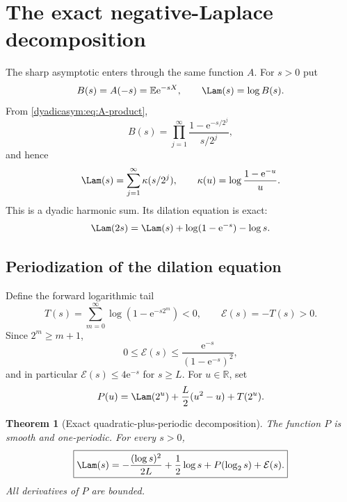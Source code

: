 \documentclass[11pt,oneside]{article}
\newtheorem{theorem}{Theorem}[section]
\theoremstyle{definition}
\theoremstyle{remark}
\newcommand{\R}{\mathbb R}
\newcommand{\e}{\mathrm e}
\newcommand{\E}{\mathbb E}
\begin{document}
\section{The exact negative-Laplace decomposition}
\label{dyadicasym:sec:laplace-product}

The sharp asymptotic enters through the same function $A$.  For $s>0$ put
\begin{equation}
 B(s)=A(-s)=\E\e^{-sX},
 \qquad
 \Lam(s)=\log B(s).                                         \label{dyadicasym:eq:B-Lambda}
\end{equation}
From \eqref{dyadicasym:eq:A-product},
\begin{equation}
 B(s)=\prod_{j=1}^{\infty}
 \frac{1-\e^{-s/2^j}}{s/2^j},                               \label{dyadicasym:eq:B-product}
\end{equation}
and hence
\begin{equation}
 \Lam(s)=\sum_{j=1}^{\infty}\kappa(s/2^j),
 \qquad
 \kappa(u)=\log\frac{1-\e^{-u}}u.                          \label{dyadicasym:eq:Lambda-harmonic}
\end{equation}
This is a dyadic harmonic sum.  Its dilation equation is exact:
\begin{equation}
 \Lam(2s)=\Lam(s)+\log(1-\e^{-s})-\log s.                  \label{dyadicasym:eq:Lambda-dilation}
\end{equation}

\subsection{Periodization of the dilation equation}

Define the forward logarithmic tail
\begin{equation}
 T(s)=\sum_{m=0}^{\infty}\log(1-\e^{-s2^m})<0,
 \qquad
 \mathcal E(s)=-T(s)>0.                                    \label{dyadicasym:eq:tail}
\end{equation}
Since $2^m\ge m+1$,
\begin{equation}
 0\le\mathcal E(s)\le
 \frac{\e^{-s}}{(1-\e^{-s})^2},                            \label{dyadicasym:eq:tail-bound-report}
\end{equation}
and in particular $\mathcal E(s)\le4\e^{-s}$ for $s\ge L$.
For $u\in\R$, set
\begin{equation}
 P(u)=\Lam(2^u)+\frac L2(u^2-u)+T(2^u).                    \label{dyadicasym:eq:P-report}
\end{equation}

\begin{theorem}[Exact quadratic-plus-periodic decomposition]
\label{dyadicasym:thm:periodic-decomposition}
The function $P$ is smooth and one-periodic.  For every $s>0$,
\begin{equation}
 \boxed{
 \Lam(s)=-\frac{(\log s)^2}{2L}+\frac12\log s
 +P(\log_2s)+\mathcal E(s).}                               \label{dyadicasym:eq:Lambda-periodic}
\end{equation}
All derivatives of $P$ are bounded.
\end{theorem}
\end{document}
